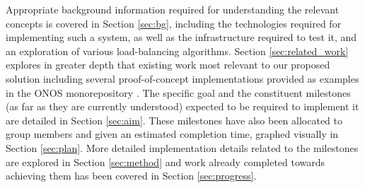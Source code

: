 Appropriate background information required for understanding the relevant concepts is covered in Section \ref{sec:bg}, including the technologies required for implementing such a system, as well as the infrastructure required to test it, and an exploration of various load-balancing algorithms. Section \ref{sec:related_work} explores in greater depth that existing work most relevant to our proposed solution including several proof-of-concept implementations provided as examples in the ONOS monorepository \cite{onos_repo}. The specific goal and the constituent milestones (as far as they are currently understood) expected to be required to implement it are detailed in Section \ref{sec:aim}. These milestones have also been allocated to group members and given an estimated completion time, graphed visually in Section \ref{sec:plan}. More detailed implementation details related to the milestones are explored in Section \ref{sec:method} and work already completed towards achieving them has been covered in Section \ref{sec:progress}.


